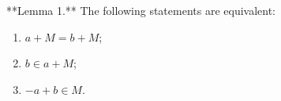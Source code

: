 **Lemma 1.** The following statements are equivalent:
\begin{enumerate}
\item[(1)] $a + M = b + M$;
\item[(2)] $b \in a + M$;
\item[(3)] $-a + b \in M$.
\end{enumerate}
